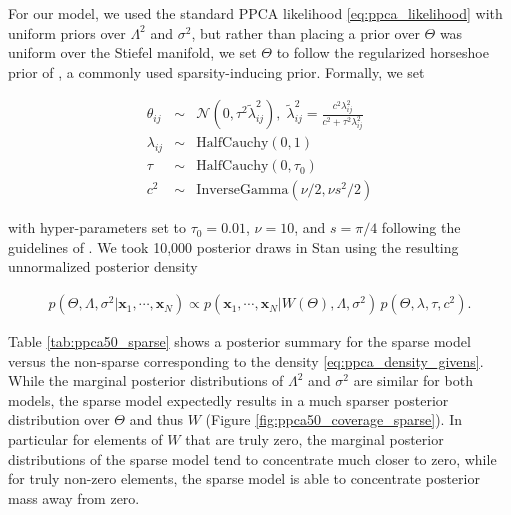 \documentclass[ba]{imsart}
\newcommand{\mb}[1]{\mathbf{#1}}
\numberwithin{equation}{section}
\theoremstyle{plain}
\begin{document}
\noindent For our model, we used the standard PPCA likelihood \ref{eq:ppca_likelihood} with uniform priors over $\Lambda^2$ and $\sigma^2$, but rather than placing a prior over $\Theta$ was uniform over the Stiefel manifold, we set $\Theta$ to follow the regularized horseshoe prior of \cite{piironen2017sparsity}, a commonly used sparsity-inducing prior. Formally, we set

\begin{eqnarray}
\theta_{ij} &\sim& \mathcal{N}(0, \tau^2 \tilde{\lambda}_{ij}^2),\; \tilde{\lambda}_{ij}^2 = \frac{c^2 \lambda_{ij}^2}{c^2 + \tau^2 \lambda_{ij}^2}\\
\lambda_{ij} &\sim& \mathrm{Half Cauchy}(0,1)\nonumber \\
\tau &\sim& \mathrm{Half Cauchy}(0,\tau_0)\nonumber \\
c^2 &\sim& \mathrm{Inverse Gamma}(\nu/2, \nu s^2/2)\nonumber
\end{eqnarray}

\noindent with hyper-parameters set to $\tau_0 = 0.01$, $\nu = 10$, and $s = \pi/4$ following the guidelines of \cite{piironen2017sparsity}. We took 10,000 posterior draws in Stan using the resulting unnormalized posterior density

\begin{eqnarray}
\label{eq:ppca_sparse_density_givens}
p(\Theta, \Lambda, \sigma^2 | \mb{x}_1, \cdots, \mb{x}_N) \propto p(\mb{x}_1, \cdots, \mb{x}_N | W(\Theta), \Lambda, \sigma^2)\, p(\Theta, \lambda, \tau, c^2).
\end{eqnarray}

\noindent Table \ref{tab:ppca50_sparse} shows a posterior summary for the sparse model versus the non-sparse corresponding to the density \ref{eq:ppca_density_givens}. While the marginal posterior distributions of $\Lambda^2$ and $\sigma^2$ are similar for both models, the sparse model expectedly results in a much sparser posterior distribution over $\Theta$ and thus $W$ (Figure \ref{fig:ppca50_coverage_sparse}). In particular for elements of $W$ that are truly zero, the marginal posterior distributions of the sparse model tend to concentrate much closer to zero, while for truly non-zero elements, the sparse model is able to concentrate posterior mass away from zero.
\end{document}
